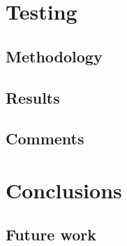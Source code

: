 \documentclass[]{usiinfbachelorproject}
\begin{document}

\vspace{\fill}

\pagebreak

\section{Testing} \label{Testing}


\subsection{Methodology}

\subsection{Results}

\subsection{Comments}

\vspace{\fill}

\pagebreak

\section{Conclusions} \label{Conclusions}

\subsection{Future work}

\vspace{\fill}

\pagebreak



\end{document}
